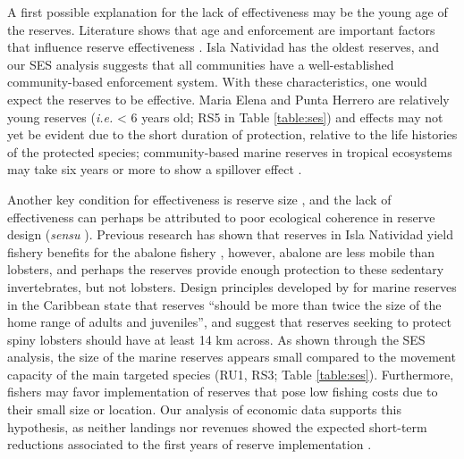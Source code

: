 \documentclass{frontiersSCNS}
\begin{document}
A first possible explanation for the lack of effectiveness may be the young age of the reserves. Literature shows that age and enforcement are important factors that influence reserve effectiveness \citep{edgar_2014-UO,babcock_2010}. Isla Natividad has the oldest reserves, and our SES analysis suggests that all communities have a well-established community-based enforcement system. With these characteristics, one would expect the reserves to be effective. Maria Elena and Punta Herrero are relatively young reserves (\emph{i.e.} \textless{} 6 years old; RS5 in Table \ref{table:ses}) and effects may not yet be evident due to the short duration of protection, relative to the life histories of the protected species; community-based marine reserves in tropical ecosystems may take six years or more to show a spillover effect \citep{dasilva_2015-zX}.

Another key condition for effectiveness is reserve size \citep{edgar_2014-UO}, and the lack of effectiveness can perhaps be attributed to poor ecological coherence in reserve design (\emph{sensu} \citet{rees_2018}). Previous research has shown that reserves in Isla Natividad yield fishery benefits for the abalone fishery \citep{rossetto_2015-V0}, however, abalone are less mobile than lobsters, and perhaps the reserves provide enough protection to these sedentary invertebrates, but not lobsters. Design principles developed by \citet{green_2017} for marine reserves in the Caribbean state that reserves ``should be more than twice the size of the home range of adults and juveniles'', and suggest that reserves seeking to protect spiny lobsters should have at least 14 km across. As shown through the SES analysis, the size of the marine reserves appears small compared to the movement capacity of the main targeted species (RU1, RS3; Table \ref{table:ses}). Furthermore, fishers may favor implementation of reserves that pose low fishing costs due to their small size or location. Our analysis of economic data supports this hypothesis, as neither landings nor revenues showed the expected short-term reductions associated to the first years of reserve implementation \citep{ovando_2016-Wg}.
\end{document}
